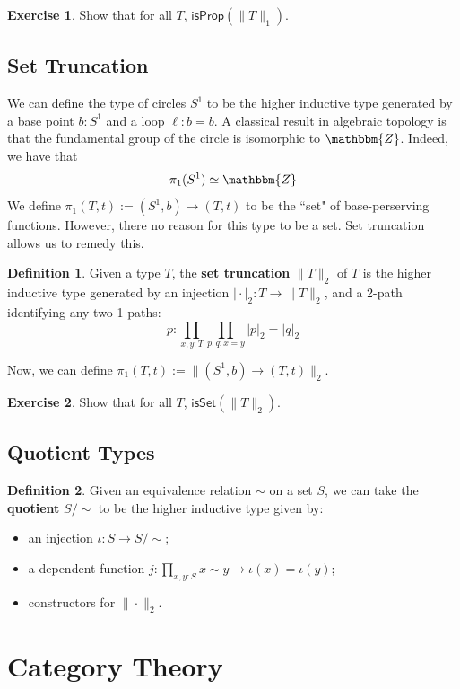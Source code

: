 \documentclass{amsart}
\theoremstyle{definition}
\newtheorem{ex}{Exercise}[section]
\newtheorem{defn}{Definition}[section]
\newcommand{\Z}{\mathbbm{Z}}
\newcommand{\isProp}{\ensuremath{\mathsf{isProp}}}
\newcommand{\isSet}{\ensuremath{\mathsf{isSet}}}
\renewcommand{\emph}{\textbf}
\begin{document}
\begin{ex}
    Show that for all $T$, $\isProp(\| T \|_1)$.
\end{ex}

\subsection{Set Truncation}\label{sec:set-truncation}
We can define the type of circles $S^{1}$ to be the higher inductive type generated by a base point $b : S^{1}$ and a loop $\ell : b = b$.
A classical result in algebraic topology is that the fundamental group of the circle is isomorphic to $\Z$.
Indeed, we have that
\[
    \pi_{1}(S^{1}) \simeq \Z
\]
We define $\pi_{1}(T, t) := (S^{1}, b) \to (T, t)$ to be the ``set" of base-perserving functions.
However, there no reason for this type to be a set.
Set truncation allows us to remedy this.
\begin{defn}
    Given a type $T$, the \emph{set truncation} $\| T \|_2$ of $T$ is the higher inductive type generated by an injection $\vert \cdot \vert_2 : T \to \| T \|_2$, and a 2-path identifying any two 1-paths:
    \[p : \prod_{x,y : T}\prod_{p,q : x = y} \vert p \vert_2 = \vert q \vert_2\]
\end{defn}
Now, we can define $\pi_{1}(T, t) := \| (S^{1}, b) \to (T, t) \|_{2}$.
\begin{ex}
    Show that for all $T$, $\isSet(\| T \|_2)$.
\end{ex}

\subsection{Quotient Types}\label{sec:quotient-types}
\begin{defn}
    Given an equivalence relation $\sim$ on a set $S$, we can take the \emph{quotient} $S/\sim$ to be the higher inductive type given by:
    \begin{itemize}
        \item an injection $\iota : S \to S/\sim$;
        \item a dependent function $j : \prod_{x, y : S} x \sim y \to \iota(x) = \iota(y)$;
        \item constructors for $\| \cdot \|_2$.
    \end{itemize}
\end{defn}

\section{Category Theory}
\end{document}
